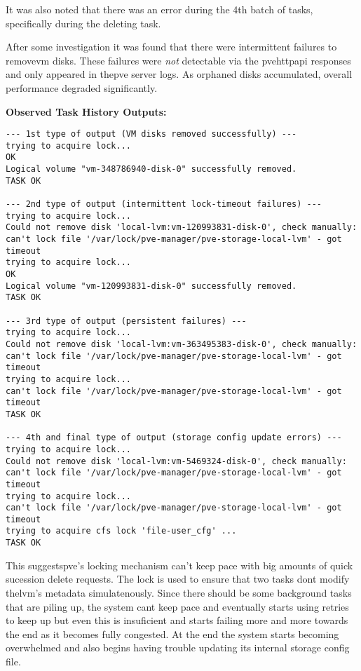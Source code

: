         It was also noted that there was an error during the 4th batch of tasks, specifically during the deleting task.

        After some investigation it was found that there were intermittent failures to remove\ac{vm} disks. These failures 
        were \emph{not} detectable via the \ac{pve}\ac{http}\ac{api} responses and only appeared in the\ac{pve} server 
        logs. As orphaned disks accumulated, overall performance degraded significantly.

        \medskip
        \noindent\textbf{Observed Task History Outputs:}
        \begin{verbatim}
--- 1st type of output (VM disks removed successfully) ---
trying to acquire lock...
OK
Logical volume "vm-348786940-disk-0" successfully removed.
TASK OK

--- 2nd type of output (intermittent lock-timeout failures) ---
trying to acquire lock...
Could not remove disk 'local-lvm:vm-120993831-disk-0', check manually:
can't lock file '/var/lock/pve-manager/pve-storage-local-lvm' - got timeout
trying to acquire lock...
OK
Logical volume "vm-120993831-disk-0" successfully removed.
TASK OK

--- 3rd type of output (persistent failures) ---
trying to acquire lock...
Could not remove disk 'local-lvm:vm-363495383-disk-0', check manually:
can't lock file '/var/lock/pve-manager/pve-storage-local-lvm' - got timeout
trying to acquire lock...
can't lock file '/var/lock/pve-manager/pve-storage-local-lvm' - got timeout
TASK OK

--- 4th and final type of output (storage config update errors) ---
trying to acquire lock...
Could not remove disk 'local-lvm:vm-5469324-disk-0', check manually:
can't lock file '/var/lock/pve-manager/pve-storage-local-lvm' - got timeout
trying to acquire lock...
can't lock file '/var/lock/pve-manager/pve-storage-local-lvm' - got timeout
trying to acquire cfs lock 'file-user_cfg' ...
TASK OK
        \end{verbatim}

        This suggests\ac{pve}'s locking mechanism can't keep pace with big amounts of quick sucession delete requests. 
        The lock is used to ensure that two tasks dont modify the\ac{lvm}'s metadata simulatenously. Since there should be 
        some background tasks that are piling up, the system cant keep pace and eventually starts using retries to keep 
        up but even this is insuficient and starts failing more and more towards the end as it becomes fully congested. 
        At the end the system starts becoming overwhelmed and also begins having trouble updating its internal storage 
        config file.  

